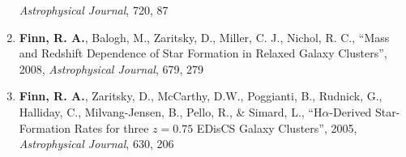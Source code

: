 \documentclass[11pt]{article}
\begin{document}
\begin{flushleft}
\begin{enumerate}{\setlength{\leftmargin}{0in}}
{\it Astrophysical Journal}, 720, 87
\vspace{-.2cm}
\item {\bf Finn, R. A.}, Balogh, M., Zaritsky, D., Miller, C. J., Nichol, R. C., 
``Mass and Redshift Dependence of Star Formation in Relaxed Galaxy Clusters'', 2008, {\it Astrophysical Journal}, 679, 279
\vspace{-.2cm}
\item {\bf Finn, R. A.}, Zaritsky, D., McCarthy, D.W., Poggianti, B., Rudnick, G., Halliday, C., Milvang-Jensen, B., Pello, R., \& Simard, L., 
``H$\alpha$-Derived Star-Formation Rates for three $z=0.75$ EDisCS Galaxy Clusters'', 2005, {\it Astrophysical Journal}, 630, 206
\vspace{-.2cm}


\end{enumerate}
\end{flushleft}
\end{document}
